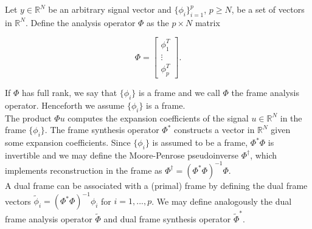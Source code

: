 \documentclass[journal]{IEEEtran}
\newcommand{\reals}{\mathbb{R}}
\begin{document}
Let $y\in\reals^N$ be an arbitrary signal vector and $\{\phi_i\}_{i=1}^p$, $p\ge N$, be a set of vectors in $\reals^N$.  Define the analysis operator $\Phi$ as the $p\times N$ matrix

\[ \Phi = \begin{bmatrix}\phi_1^T\\\vdots\\\phi_p^T\end{bmatrix}. \] 

   \noindent If $\Phi$ has full rank, we say that $\{\phi_i\}$ is a frame and we call $\Phi$ the frame analysis operator.  Henceforth we assume $\{\phi_i\}$ is a frame.\\
   
   The product $\Phi u$ computes the expansion coefficients of the signal ${u\in\reals^N}$ in the frame $\{\phi_i\}$.  The frame synthesis operator $\Phi^\ast$ constructs a vector in $\reals^N$ given some expansion coefficients.  Since $\{\phi_i\}$ is assumed to be a frame, $\Phi^\ast\Phi$ is invertible and we may define the Moore-Penrose pseudoinverse $\Phi^\dagger$, which implements reconstruction in the frame as $\Phi^\dagger=\left(\Phi^\ast\Phi\right)^{-1}\Phi$.\\

   A dual frame can be associated with a (primal) frame by defining the dual frame vectors $\tilde{\phi}_i = \left(\Phi^\ast\Phi\right)^{-1}\phi_i$ for $i=1,...,p$.  We may define analogously the dual frame analysis operator $\tilde{\Phi}$ and dual frame synthesis operator $\tilde{\Phi}^\ast$.\\
\end{document}

